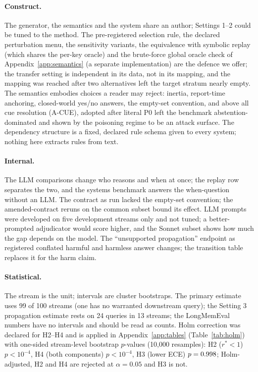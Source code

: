 \paragraph{Construct.} The generator, the semantics and the system share an author; Settings 1--2 could be tuned to the method. The pre-registered selection rule, the declared perturbation menu, the sensitivity variants, the equivalence with symbolic replay (which shares the per-key oracle) and the brute-force global oracle check of Appendix~\ref{app:semantics} (a separate implementation) are the defence we offer; the transfer setting is independent in its data, not in its mapping, and the mapping was reached after two alternatives left the target stratum nearly empty. The semantics embodies choices a reader may reject: inertia, report-time anchoring, closed-world yes/no answers, the empty-set convention, and above all cue resolution (A-CUE), adopted after literal P0 left the benchmark abstention-dominated and shown by the poisoning regime to be an attack surface. The dependency structure is a fixed, declared rule schema given to every system; nothing here extracts rules from text.

\paragraph{Internal.} The LLM comparisons change who reasons and when at once; the replay row separates the two, and the systems benchmark answers the when-question without an LLM. The contract as run lacked the empty-set convention; the amended-contract reruns on the common subset bound its effect. LLM prompts were developed on five development streams only and not tuned; a better-prompted adjudicator would score higher, and the Sonnet subset shows how much the gap depends on the model. The ``unsupported propagation'' endpoint as registered conflated harmful and harmless answer changes; the transition table replaces it for the harm claim.

\paragraph{Statistical.} The stream is the unit; intervals are cluster bootstraps. The primary estimate uses 99 of 100 streams (one has no warranted downstream query); the Setting 3 propagation estimate rests on 24 queries in 13 streams; the LongMemEval numbers have no intervals and should be read as counts. Holm correction was declared for H2--H4 and is applied in Appendix~\ref{app:tables} (Table~\ref{tab:holm}) with one-sided stream-level bootstrap $p$-values (10{,}000 resamples): H2 ($r^*<1$) $p<10^{-4}$, H4 (both components) $p<10^{-4}$, H3 (lower ECE) $p=0.998$; Holm-adjusted, H2 and H4 are rejected at $\alpha=0.05$ and H3 is not.

